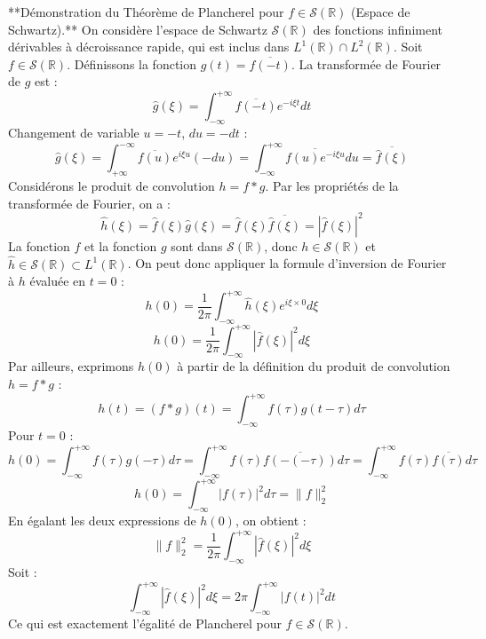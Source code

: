 \documentclass[11pt,a4paper]{article}
\begin{document}
**Démonstration du Théorème de Plancherel pour $f \in \mathcal{S}(\mathbb{R})$ (Espace de Schwartz).**
On considère l'espace de Schwartz $\mathcal{S}(\mathbb{R})$ des fonctions infiniment dérivables à décroissance rapide, qui est inclus dans $L^1(\mathbb{R}) \cap L^2(\mathbb{R})$.
Soit $f \in \mathcal{S}(\mathbb{R})$. Définissons la fonction $g(t) = \overline{f(-t)}$.
La transformée de Fourier de $g$ est :
$$ \hat{g}(\xi) = \int_{-\infty}^{+\infty} \overline{f(-t)} e^{-i\xi t} dt $$
Changement de variable $u = -t$, $du = -dt$ :
$$ \hat{g}(\xi) = \int_{+\infty}^{-\infty} \overline{f(u)} e^{i\xi u} (-du) = \int_{-\infty}^{+\infty} \overline{f(u) e^{-i\xi u}} du = \overline{\hat{f}(\xi)} $$
Considérons le produit de convolution $h = f * g$. Par les propriétés de la transformée de Fourier, on a :
$$ \hat{h}(\xi) = \hat{f}(\xi) \hat{g}(\xi) = \hat{f}(\xi) \overline{\hat{f}(\xi)} = |\hat{f}(\xi)|^2 $$
La fonction $f$ et la fonction $g$ sont dans $\mathcal{S}(\mathbb{R})$, donc $h \in \mathcal{S}(\mathbb{R})$ et $\hat{h} \in \mathcal{S}(\mathbb{R}) \subset L^1(\mathbb{R})$.
On peut donc appliquer la formule d'inversion de Fourier à $h$ évaluée en $t=0$ :
$$ h(0) = \frac{1}{2\pi} \int_{-\infty}^{+\infty} \hat{h}(\xi) e^{i\xi \times 0} d\xi $$
$$ h(0) = \frac{1}{2\pi} \int_{-\infty}^{+\infty} |\hat{f}(\xi)|^2 d\xi $$
Par ailleurs, exprimons $h(0)$ à partir de la définition du produit de convolution $h = f * g$ :
$$ h(t) = (f * g)(t) = \int_{-\infty}^{+\infty} f(\tau) g(t - \tau) d\tau $$
Pour $t = 0$ :
$$ h(0) = \int_{-\infty}^{+\infty} f(\tau) g(-\tau) d\tau = \int_{-\infty}^{+\infty} f(\tau) \overline{f(-(-\tau))} d\tau = \int_{-\infty}^{+\infty} f(\tau) \overline{f(\tau)} d\tau $$
$$ h(0) = \int_{-\infty}^{+\infty} |f(\tau)|^2 d\tau = \|f\|_2^2 $$
En égalant les deux expressions de $h(0)$, on obtient :
$$ \|f\|_2^2 = \frac{1}{2\pi} \int_{-\infty}^{+\infty} |\hat{f}(\xi)|^2 d\xi $$
Soit :
$$ \int_{-\infty}^{+\infty} |\hat{f}(\xi)|^2 d\xi = 2\pi \int_{-\infty}^{+\infty} |f(t)|^2 dt $$
Ce qui est exactement l'égalité de Plancherel pour $f \in \mathcal{S}(\mathbb{R})$.
\end{document}
